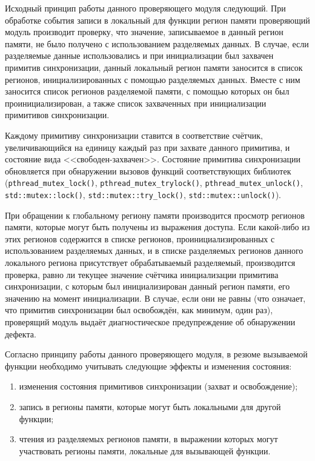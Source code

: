 Исходный принцип работы данного проверяющего модуля следующий. При обработке события записи в локальный для функции регион памяти проверяющий модуль производит проверку, что значение, записываемое в данный регион памяти, не было получено с использованием разделяемых данных. В случае, если разделяемые данные использовались и при инициализации был захвачен примитив синхронизации, данный локальный регион памяти заносится в список регионов, инициализированных с помощью разделяемых данных. Вместе с ним заносится список регионов разделяемой памяти, с помощью которых он был проинициализирован, а также список захваченных при инициализации примитивов синхронизации.

Каждому примитиву синхронизации ставится в соответствие счётчик, увеличивающийся на единицу каждый раз при захвате данного примитива, и состояние вида <<свободен-захвачен>>. Состояние примитива синхронизации обновляется при обнаружении вызовов функций соответствующих библиотек (\texttt{pthread\_mutex\_lock()}, \texttt{pthread\_mutex\_trylock()}, \texttt{pthread\_mutex\_unlock()}, \texttt{std::mutex::lock()}, \texttt{std::mutex::try\_lock()}, \texttt{std::mutex::unlock()}).

При обращении к глобальному региону памяти производится просмотр регионов памяти, которые могут быть получены из выражения доступа. Если какой-либо из этих регионов содержится в списке регионов, проинициализированных с использованием разделяемых данных, и в списке разделяемых регионов данного локального региона присутствует обрабатываемый разделяемый, производится проверка, равно ли текущее значение счётчика инициализации примитива синхронизации, с которым был инициализирован данный регион памяти, его значению на момент инициализации. В случае, если они не равны (что означает, что примитив синхронизации был освобождён, как минимум, один раз), проверящий модуль выдаёт диагностическое предупреждение об обнаружении дефекта.

Согласно принципу работы данного проверяющего модуля, в резюме вызываемой функции необходимо учитывать следующие эффекты и изменения состояния:

\begin{enumerate}
 \item изменения состояния примитивов синхронизации (захват и освобождение);
 \item запись в регионы памяти, которые могут быть локальными для другой функции;
 \item чтения из разделяемых регионов памяти, в выражении которых могут участвовать регионы памяти, локальные для вызывающей функции.
\end{enumerate}


